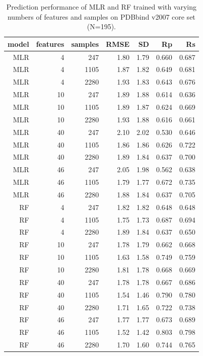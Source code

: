 \documentclass[10pt,conference,compsocconf]{IEEEtran}
\begin{document}
\begin{table}
\centering
\begin{tabular*}{\linewidth}{@{\extracolsep{\fill}}rrrrrrr}
\toprule
model & features & samples & RMSE & SD & Rp & Rs\\
\midrule
MLR &  4 &  247 & 1.80 & 1.79 & 0.660 & 0.687\\
MLR &  4 & 1105 & 1.87 & 1.82 & 0.649 & 0.681\\
MLR &  4 & 2280 & 1.93 & 1.83 & 0.643 & 0.676\\
MLR & 10 &  247 & 1.89 & 1.88 & 0.614 & 0.636\\
MLR & 10 & 1105 & 1.89 & 1.87 & 0.624 & 0.669\\
MLR & 10 & 2280 & 1.93 & 1.88 & 0.616 & 0.661\\
MLR & 40 &  247 & 2.10 & 2.02 & 0.530 & 0.646\\
MLR & 40 & 1105 & 1.86 & 1.86 & 0.626 & 0.722\\
MLR & 40 & 2280 & 1.89 & 1.84 & 0.637 & 0.700\\
MLR & 46 &  247 & 2.05 & 1.98 & 0.562 & 0.638\\
MLR & 46 & 1105 & 1.79 & 1.77 & 0.672 & 0.735\\
MLR & 46 & 2280 & 1.88 & 1.84 & 0.637 & 0.705\\
 RF &  4 &  247 & 1.82 & 1.82 & 0.648 & 0.648\\
 RF &  4 & 1105 & 1.75 & 1.73 & 0.687 & 0.694\\
 RF &  4 & 2280 & 1.89 & 1.84 & 0.637 & 0.650\\
 RF & 10 &  247 & 1.78 & 1.79 & 0.662 & 0.668\\
 RF & 10 & 1105 & 1.63 & 1.58 & 0.749 & 0.759\\
 RF & 10 & 2280 & 1.81 & 1.78 & 0.668 & 0.669\\
 RF & 40 &  247 & 1.78 & 1.78 & 0.667 & 0.686\\
 RF & 40 & 1105 & 1.54 & 1.46 & 0.790 & 0.780\\
 RF & 40 & 2280 & 1.71 & 1.65 & 0.722 & 0.738\\
 RF & 46 &  247 & 1.77 & 1.77 & 0.673 & 0.689\\
 RF & 46 & 1105 & 1.52 & 1.42 & 0.803 & 0.798\\
 RF & 46 & 2280 & 1.70 & 1.60 & 0.744 & 0.765\\
\bottomrule
\end{tabular*}
\caption{Prediction performance of MLR and RF trained with varying numbers of features and samples on PDBbind v2007 core set (N=195).}
\label{tbl:tst195}
\end{table}
\end{document}
